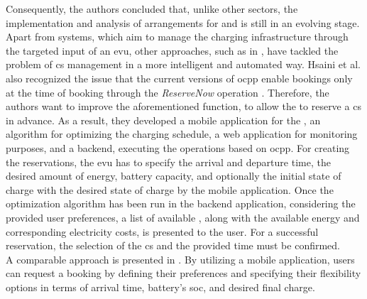Consequently, the authors concluded that, unlike other sectors, the implementation and analysis of arrangements for  and  is still in an evolving stage. \\
\noindent Apart from systems, which aim to manage the charging infrastructure through the targeted input of an \acrshort{evu}, other approaches, such as in \cite{hsaini_ocpp-based_2022}, have tackled the problem of \acrshort{cs} management in a more intelligent and automated way.
Hsaini et al. also recognized the issue that the current versions of \acrshort{ocpp} enable bookings only at the time of booking through the \textit{ReserveNow} operation \cite{noauthor_ocpp_nodate}.
Therefore, the authors want to improve the aforementioned function, to allow the  to reserve a \acrshort{cs} in advance.
As a result, they developed a mobile application for the , an algorithm for optimizing the charging schedule, a web application for monitoring purposes, and a backend, executing the operations based on \acrshort{ocpp}.
For creating the reservations, the \acrshort{evu} has to specify the arrival and departure time, the desired amount of energy, battery capacity, and optionally the initial state of charge with the desired state of charge by the mobile application.
Once the optimization algorithm has been run in the backend application, considering the provided user preferences, a list of available , along with the available energy and corresponding electricity costs, is presented to the user. For a successful reservation, the selection of the \acrshort{cs} and the provided time must be confirmed. \\
\noindent A comparable approach is presented in \cite{orcioni_ev_2020}. By utilizing a mobile application, users can request a booking by defining their preferences and specifying their flexibility options in terms of arrival time, battery's \acrshort{soc}, and desired final charge.
